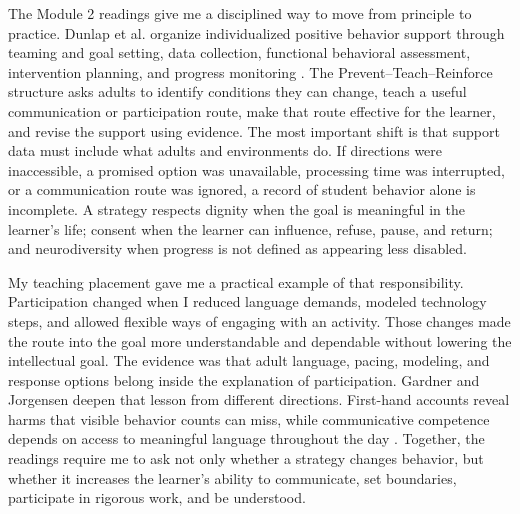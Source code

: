 \vspace{-0.2cm}

\vspace{-0.2cm}
The Module 2 readings give me a disciplined way to move from principle to practice. Dunlap et al. organize individualized positive behavior support through teaming and goal setting, data collection, functional behavioral assessment, intervention planning, and progress monitoring \citep{dunlap2019ptr}. The Prevent--Teach--Reinforce structure asks adults to identify conditions they can change, teach a useful communication or participation route, make that route effective for the learner, and revise the support using evidence. The most important shift is that support data must include what adults and environments do. If directions were inaccessible, a promised option was unavailable, processing time was interrupted, or a communication route was ignored, a record of student behavior alone is incomplete. A strategy respects dignity when the goal is meaningful in the learner's life; consent when the learner can influence, refuse, pause, and return; and neurodiversity when progress is not defined as appearing less disabled.

My teaching placement gave me a practical example of that responsibility. Participation changed when I reduced language demands, modeled technology steps, and allowed flexible ways of engaging with an activity. Those changes made the route into the goal more understandable and dependable without lowering the intellectual goal. The evidence was that adult language, pacing, modeling, and response options belong inside the explanation of participation. Gardner and Jorgensen deepen that lesson from different directions. First-hand accounts reveal harms that visible behavior counts can miss, while communicative competence depends on access to meaningful language throughout the day \citep{gardner2017firsthand,jorgensen2018competence}. Together, the readings require me to ask not only whether a strategy changes behavior, but whether it increases the learner's ability to communicate, set boundaries, participate in rigorous work, and be understood.


